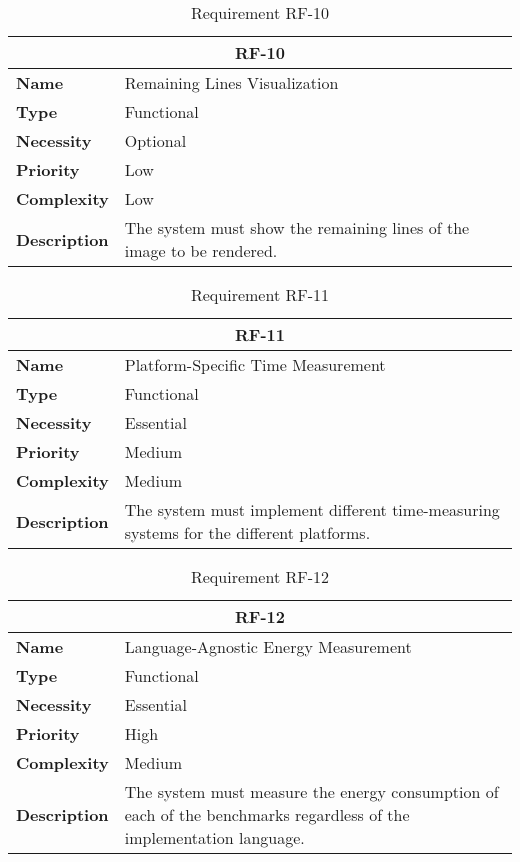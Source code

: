 \begin{table}[H]
    \centering
    \begin{tabular}{l p{10cm}}
        \toprule
        \multicolumn{2}{c}{\textbf{RF-10}} \\
        \toprule
        \textbf{Name}               & Remaining Lines Visualization \\
        \textbf{Type}               & Functional \\
        \textbf{Necessity}          & Optional \\
        \textbf{Priority}           & Low \\
        \textbf{Complexity}         & Low \\
        \textbf{Description}        & The system must show the remaining lines of the image to be rendered. \\
        \bottomrule
    \end{tabular}
\caption{Requirement RF-10}\label{tab:rf-10}
\end{table}

\begin{table}[H]
    \centering
    \begin{tabular}{l p{10cm}}
        \toprule
        \multicolumn{2}{c}{\textbf{RF-11}} \\
        \toprule
        \textbf{Name}               & Platform-Specific Time Measurement \\
        \textbf{Type}               & Functional \\
        \textbf{Necessity}          & Essential \\
        \textbf{Priority}           & Medium \\
        \textbf{Complexity}         & Medium \\
        \textbf{Description}        & The system must implement different time-measuring systems for the different platforms. \\
        \bottomrule
    \end{tabular}
\caption{Requirement RF-11}\label{tab:rf-11}
\end{table}

\begin{table}[H]
    \centering
    \begin{tabular}{l p{10cm}}
        \toprule
        \multicolumn{2}{c}{\textbf{RF-12}} \\
        \toprule
        \textbf{Name}               & Language-Agnostic Energy Measurement \\
        \textbf{Type}               & Functional \\
        \textbf{Necessity}          & Essential \\
        \textbf{Priority}           & High \\
        \textbf{Complexity}         & Medium \\
        \textbf{Description}        & The system must measure the energy consumption of each of the benchmarks regardless of the implementation language. \\
        \bottomrule
    \end{tabular}
\caption{Requirement RF-12}\label{tab:rf-12}
\end{table}

